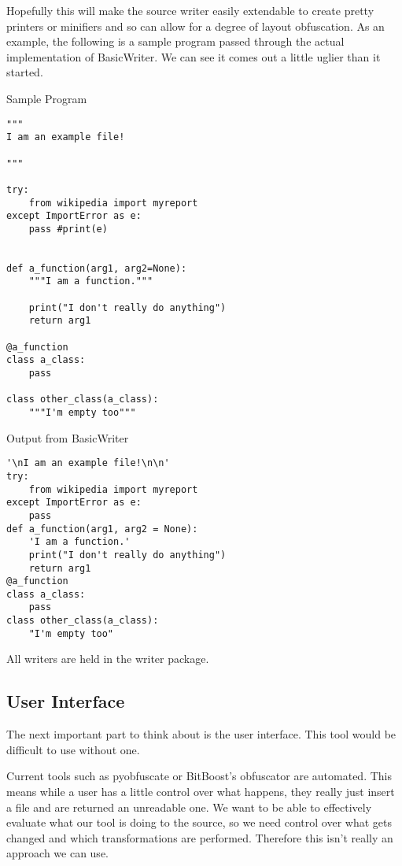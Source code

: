 \documentclass{report}
\begin{document}
Hopefully this will make the source writer easily extendable to create pretty printers or minifiers and so can allow for a degree of layout
obfuscation. As an example, the following is a sample program passed through the actual implementation of BasicWriter. We can see it comes
out a little uglier than it started.

\begin{minipage}[t]{0.45\linewidth}
Sample Program

\lstset{basicstyle=\tiny}
\begin{lstlisting}
"""
I am an example file!

"""

try:
    from wikipedia import myreport
except ImportError as e:
    pass #print(e)


def a_function(arg1, arg2=None):
    """I am a function."""

    print("I don't really do anything")
    return arg1

@a_function
class a_class:
    pass

class other_class(a_class):
    """I'm empty too"""
\end{lstlisting}
\end{minipage}
\hspace{0.5cm}
\begin{minipage}[t]{0.45\linewidth}
Output from BasicWriter

\lstset{basicstyle=\tiny}
\begin{lstlisting}
'\nI am an example file!\n\n'
try:
    from wikipedia import myreport
except ImportError as e:
    pass
def a_function(arg1, arg2 = None):
    'I am a function.'
    print("I don't really do anything")
    return arg1
@a_function
class a_class:
    pass
class other_class(a_class):
    "I'm empty too"
\end{lstlisting}
\end{minipage}

All writers are held in the writer package.

\subsection{User Interface}

The next important part to think about is the user interface. This tool would be difficult to use without one.

Current tools such as pyobfuscate or BitBoost's obfuscator are automated. This means while a user has a little control
over what happens, they really just insert a file and are returned an unreadable one. We want to be able to effectively
evaluate what our tool is doing to the source, so we need control over what gets changed and which transformations are
performed. Therefore this isn't really an approach we can use.
\end{document}
